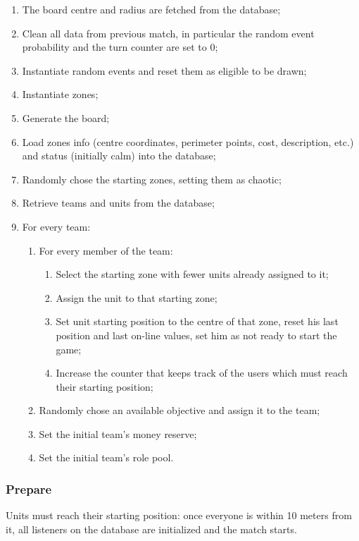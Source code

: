 			\begin{enumerate}
				\item The board centre and radius are fetched from the database;
				\item Clean all data from previous match, in particular the random event probability and the turn counter are set to 0;
				\item Instantiate random events and reset them as eligible to be drawn;
				\item Instantiate zones;
				\item Generate the board;
				\item Load zones info (centre coordinates, perimeter points, cost, description, etc.) and status (initially calm) into the database;
				\item Randomly chose the starting zones, setting them as chaotic;
				\item Retrieve teams and units from the database;
				\item For every team: 
				\begin{enumerate}					
					\item For every member of the team:
					\begin{enumerate}
						\item Select the starting zone with fewer units already assigned to it;
						\item Assign the unit to that starting zone;
						\item Set unit starting position to the centre of that zone, reset his last position and last on-line values, set him as not ready to start the game;
						\item Increase the counter that keeps track of the users which must reach their starting position;
					\end{enumerate}
					\item Randomly chose an available objective and assign it to the team;
					\item Set the initial team's money reserve;
					\item Set the initial team's role pool.
				\end{enumerate}
			\end{enumerate}
		
		\subsubsection{Prepare}
		
			Units must reach their starting position: once everyone is within 10 meters from it, all listeners on the database are initialized and the match starts.
		
